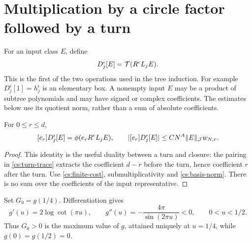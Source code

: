 \section{Multiplication by a circle factor followed by a turn}\label{cs:characters}

For an input class \(E\), define
\begin{equation}\label{cs:decorated}
 D_j^\epsilon[E]=\mathcal T(R^\epsilon L_jE).
\end{equation}
This is the first of the two operations used in the tree induction.
For example $D_j^\epsilon[1]=h_j^\epsilon$ is an elementary box. A
nonempty input $E$ may be a product of subtree polynomials and may
have signed or complex coefficients. The estimates below use its
quotient norm, rather than a sum of absolute coefficients.

\begin{lemma}\label{cs:duality}
For \(0\le r\le d\),
\begin{equation}\label{cs:dual}
 [e_{r}]D_j^\epsilon[E]=\phi(e_rR^\epsilon L_jE),\qquad
 |[e_{r}]D_j^\epsilon[E]|\le CN^A\lVert E\rVert_{\mathcal J}w_{N,r}.
\end{equation}
\end{lemma}
\begin{proof}
This identity is the useful duality between a turn and closure: the pairing in \eqref{cs:turn-trace} extracts the coefficient
\(d-r\) before the turn, hence coefficient \(r\) after the turn.
Use \eqref{cs:finite-cost}, submultiplicativity and
\eqref{cs:basis-norm}. There is no sum over the coefficients of
the input representative.
\end{proof}

Set \(G_0=g(1/4)\). Differentiation gives
\begin{equation}\label{cs:g-derivatives}
 g'(u)=2\log\cot(\pi u),\qquad
 g''(u)=-\frac{4\pi}{\sin(2\pi u)}<0,\qquad 0<u<1/2.
\end{equation}
Thus $G_0>0$ is the maximum value of $g$, attained uniquely at $u=1/4$, while
\(g(0)=g(1/2)=0\).

